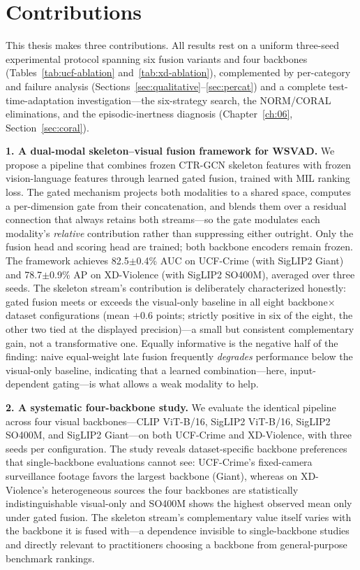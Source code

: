 \section{Contributions}
\label{sec:intro-contributions}

This thesis makes three contributions. All results rest on a uniform three-seed
experimental protocol spanning six fusion variants and four backbones
(Tables~\ref{tab:ucf-ablation} and~\ref{tab:xd-ablation}), complemented by
per-category and failure analysis (Sections~\ref{sec:qualitative}--\ref{sec:percat})
and a complete test-time-adaptation investigation---the six-strategy search, the
NORM/CORAL eliminations, and the episodic-inertness diagnosis
(Chapter~\ref{ch:06}, Section~\ref{sec:coral}).

\textbf{1. A dual-modal skeleton--visual fusion framework for WSVAD.} We propose a pipeline that
combines frozen CTR-GCN skeleton features with frozen vision-language features through learned gated
fusion, trained with MIL ranking loss. The gated mechanism projects both modalities to a shared
space, computes a per-dimension gate from their concatenation, and blends them over a residual
connection that always retains both streams---so the gate modulates each modality's \emph{relative}
contribution rather than suppressing either outright. Only the fusion head and scoring head are
trained; both backbone encoders remain frozen. The framework achieves 82.5$\pm$0.4\% AUC on
UCF-Crime (with SigLIP2 Giant) and 78.7$\pm$0.9\% AP on XD-Violence (with SigLIP2 SO400M), averaged
over three seeds. The skeleton stream's contribution is deliberately characterized honestly: gated
fusion meets or exceeds the visual-only baseline in all eight backbone$\times$dataset configurations
(mean $+0.6$ points; strictly positive in six of the eight, the other two tied at the displayed
precision)---a small but consistent complementary gain, not a transformative one. Equally
informative is the negative half of the finding: naive equal-weight late fusion frequently
\emph{degrades} performance below the visual-only baseline, indicating that a learned
combination---here, input-dependent gating---is what allows a weak modality to help.

\textbf{2. A systematic four-backbone study.} We evaluate the identical pipeline across four visual
backbones---CLIP ViT-B/16, SigLIP2 ViT-B/16, SigLIP2 SO400M, and SigLIP2 Giant---on both UCF-Crime
and XD-Violence, with three seeds per configuration. The study reveals dataset-specific backbone
preferences that single-backbone evaluations cannot see: UCF-Crime's fixed-camera surveillance
footage favors the largest backbone (Giant), whereas on XD-Violence's heterogeneous sources the four
backbones are statistically indistinguishable visual-only and SO400M shows the highest observed mean
only under gated fusion. The skeleton stream's complementary value itself varies with the backbone
it is fused with---a dependence invisible to single-backbone studies and directly relevant to
practitioners choosing a backbone from general-purpose benchmark rankings.

